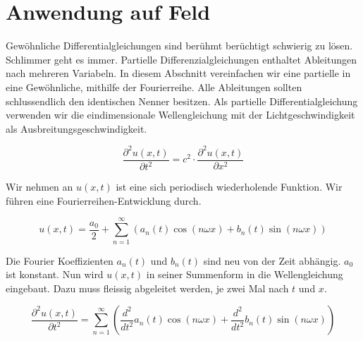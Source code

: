 %
%
%
%



\section{Anwendung auf Feld\label{fourier:section:teil0}}


Gewöhnliche Differentialgleichungen sind berühmt berüchtigt schwierig zu lösen.
Schlimmer geht es immer.
Partielle Differenzialgleichungen enthaltet Ableitungen nach mehreren Variabeln.
In diesem Abschnitt vereinfachen wir eine partielle in eine Gewöhnliche, mithilfe der Fourierreihe.
Alle Ableitungen sollten schlussendlich den identischen Nenner besitzen.
Als partielle Differentialgleichung verwenden wir die eindimensionale Wellengleichung mit der Lichtgeschwindigkeit als Ausbreitungsgeschwindigkeit. 

\begin{equation}
	\frac{\partial^2 u(x, t)}{\partial t^2} = c^2 \cdot \frac{\partial^2 u(x, t)}{\partial x^2}
\end{equation}

Wir nehmen an $u(x, t)$ ist eine sich periodisch wiederholende Funktion. 
Wir führen eine Fourierreihen-Entwicklung durch. 

\begin{equation}
	u(x,t) = \frac{a_0}{2} + \sum_{n=1}^{\infty} \left( a_n(t) \cos(n \omega x) + b_n(t) \sin(n \omega x) \right)
\end{equation}

Die Fourier Koeffizienten $a_n(t)$ und $b_n(t)$ sind neu von der Zeit abhängig. 
$a_0$ ist konstant.
Nun wird $u(x,t)$ in seiner Summenform in die Wellengleichung eingebaut. 
Dazu muss fleissig abgeleitet werden, je zwei Mal nach $t$ und $x$.

\begin{equation}
	\frac{\partial^2 u(x,t)}{\partial t^2} = \sum_{n=1}^{\infty} \left( \frac{d^2}{dt^2} a_n(t) \cos(n \omega x) + \frac{d^2}{dt^2} b_n(t) \sin(n \omega x) \right)
\end{equation}

